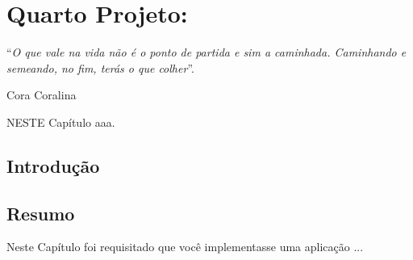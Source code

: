 \chapter{Quarto Projeto: }\label{cap:quartoProjeto}
\epigraph{``\textit{O que vale na vida não é o ponto de partida e sim a caminhada. Caminhando e semeando, no fim, terás o que colher}''.}{Cora Coralina}

\lettrine[lines=4, lhang=0.1, lraise=0, loversize=0.2, findent=0.1em]{\textcolor{corTema}{N}}{ESTE} Capítulo aaa.

\vfill

\section{Introdução}



\section{Resumo}

Neste Capítulo foi requisitado que você implementasse uma aplicação ...
